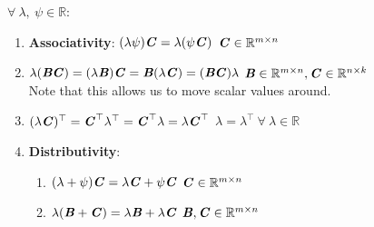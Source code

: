 $\forall\ \lambda,\ \psi \in \mathbb{R}$:
\vspace{0.2cm}
\begin{enumerate}
    \item \textbf{Associativity}:
    $(\lambda \psi )\text{\textbf{\textit{C}}} = \lambda (\psi \text{\textbf{\textit{C}}})$ \hfill $\text{\textbf{\textit{C}}} \in  \mathbb{R}^{m\times n}$
    \hfill \cite{mfml/book/mml/Deisenroth-Faisal-Ong}
    
    \item $
        \lambda (\text{\textbf{\textit{BC}}}) 
        = (\lambda \text{\textbf{\textit{B}}})\text{\textbf{\textit{C}}} 
        = \text{\textbf{\textit{B}}}(\lambda \text{\textbf{\textit{C}}}) 
        = (\text{\textbf{\textit{BC}}})\lambda 
        $ 
    \hfill $\text{\textbf{\textit{B}}} \in  \mathbb{R}^{m\times n}, \text{\textbf{\textit{C}}} \in  \mathbb{R}^{n\times k}$
    \hfill \cite{mfml/book/mml/Deisenroth-Faisal-Ong}
    \\
    Note that this allows us to move scalar values around.
    \hfill \cite{mfml/book/mml/Deisenroth-Faisal-Ong}

    \item $
        (\lambda \text{\textbf{\textit{C}}}) ^\top  
        = \text{\textbf{\textit{C}}}^\top \lambda ^\top  
        = \text{\textbf{\textit{C}}}^\top \lambda  
        = \lambda \text{\textbf{\textit{C}}}^\top 
    $
    \hfill $\lambda  = \lambda ^\top \  \forall \ \lambda  \in  \mathbb{R}$
    \hfill \cite{mfml/book/mml/Deisenroth-Faisal-Ong}

    \item \textbf{Distributivity}:
    \begin{enumerate}
        \item $(\lambda  + \psi )\text{\textbf{\textit{C}}} = \lambda \text{\textbf{\textit{C}}} + \psi \text{\textbf{\textit{C}}}$
        \hfill $\text{\textbf{\textit{C}}} \in  \mathbb{R}^{m\times n}$
        \hfill \cite{mfml/book/mml/Deisenroth-Faisal-Ong}

        \item $\lambda (\text{\textbf{\textit{B}}} + \text{\textbf{\textit{C}}}) = \lambda \text{\textbf{\textit{B}}} + \lambda \text{\textbf{\textit{C}}}$
        \hfill $\text{\textbf{\textit{B}}}, \text{\textbf{\textit{C}}} \in  \mathbb{R}^{m\times n}$
        \hfill \cite{mfml/book/mml/Deisenroth-Faisal-Ong}        
    \end{enumerate}
\end{enumerate}





